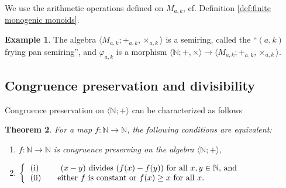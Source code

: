 \documentclass[11pt,a4paper]{article}
\newtheorem{theorem}{Theorem}[section]
\theoremstyle{definition} %
\newtheorem{example}[theorem]{Example}
\newcommand\+[1]{\mathcal{#1}} %
\newcommand{\N}{{\mathbb N}}     %
\begin{document}
We use the arithmetic operations defined on $M_{a,k}$, 
cf.\! Definition \ref{def:finite monogenic monoids}.
%
\begin{example}\label{l:varphi ak morphism semiring}   
The algebra $\langle M_{a,k};+_{a,k},\times_{a,k}\rangle$ is a semiring,
called the ``$({a,k})$ frying pan semiring'',
and $\varphi_{a,k}$ is a morphism 
$\langle\N;+,\times\rangle \to \langle M_{a,k};+_{a,k},\times_{a,k}\rangle$. 
\end{example}
%
\subsection{Congruence preservation and divisibility}\label{ss:CPD}
Congruence preservation on $\langle\N;+\rangle$ can be characterized as follows
\begin{theorem}\label{thm:CPsurN}
For a map $f:\N\to\N$, the following conditions are equivalent:
\begin{enumerate}
\item
$f:\N\to\N$ is congruence preserving on the algebra  $\langle\N;+\rangle$,
\item
$\left\{
   \text{\begin{tabular}{l}
(i) \qquad\ $(x-y)$ divides $(f(x)-f(y))$ for all $x,y\in\N$, and \label{CPa}\\
(ii) \quad\ \  either $f$ is constant or $f(x)\geq x$ for all $x$. \label{CPb}
\end{tabular}}
\right.$
\end{enumerate}
\end{theorem}
\end{document}
